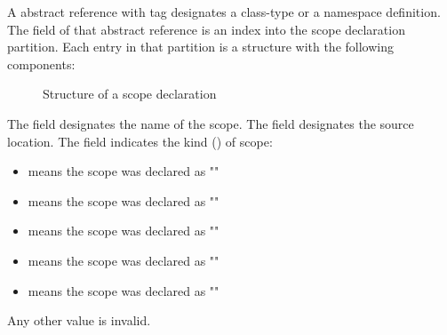 A  abstract reference with tag  designates a class-type or a namespace definition.
The  field of that abstract reference is an index into the scope declaration partition.
Each entry in that partition is a structure with the following components:
%
\begin{figure}[H]
	\centering
	\caption{Structure of a scope declaration}
	\label{fig:ifc-scope-decl-structure}
\end{figure}


\noindent
The  field designates the name of the scope.
The  field designates the source location.
The  field indicates the kind () of scope:
\begin{itemize}
  \item {} means the scope was declared as ""
  \item {} means the scope was declared as ""
  \item {} means the scope was declared as ""
  \item {} means the scope was declared as ""
  \item {} means the scope was declared as ""
\end{itemize}
Any other value is invalid.

